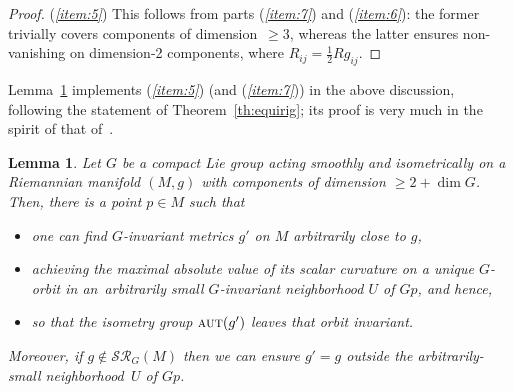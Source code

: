 \documentclass[pdftex]{sigma}%
\numberwithin{equation}{section}
\newtheorem{Lemma}[Theorem]{Lemma}
\newcommand{\cat}[1]{\textsc{#1}}
\begin{document}
\begin{proof}
 ({\it \ref{item:5}}) This follows from parts ({\it \ref{item:7}}) and ({\it \ref{item:6}}): the former trivially covers components of dimen\-sion~\mbox{$\ge 3$}, whereas the latter ensures non-vanishing on dimension-2 components, where $R_{ij} = \frac 12 Rg_{ij}$.
\end{proof}

Lemma~\ref{le:1invorb} implements ({\it \ref{item:5}}) (and ({\it \ref{item:7}})) in the above discussion, following the statement of Theo\-rem~\ref{th:equirig}; its proof is very much in the spirit of that of~\cite[Proposition~8.3]{eb}.

\begin{Lemma}\label{le:1invorb}
 Let $G$ be a compact Lie group acting smoothly and isometrically on a Riemannian manifold $(M,g)$ with components of dimension $\ge 2+\dim G$. Then, there is a point $p\in M$ such that
 \begin{itemize}\itemsep=0pt
 \item one can find $G$-invariant metrics $g'$ on $M$ arbitrarily close to $g$,
 \item achieving the maximal absolute value of its scalar curvature on a unique $G$-orbit in an~arbi\-trarily small $G$-invariant neighborhood $U$ of $Gp$, and hence,
 \item so that the isometry group $\cat{aut}(g')$ leaves that orbit invariant.
 \end{itemize}
 Moreover, if $g\not\in \mathcal{SR}_G(M)$ then we can ensure $g'= g$ outside the arbitrarily-small neighborhood~$U$ of $Gp$.
\end{Lemma}
\end{document}
